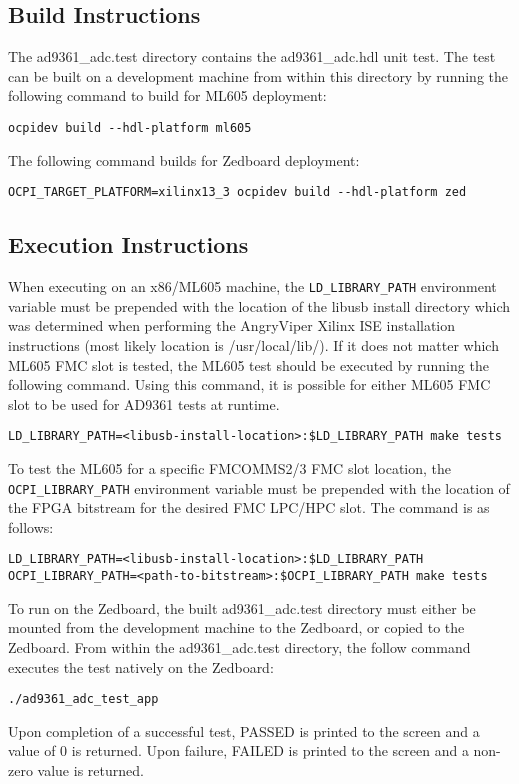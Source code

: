 \documentclass{article}
\def\comp{ad9361\_adc}
\begin{document}
\subsection*{Build Instructions}
The \comp{}.test directory contains the \comp{}.hdl unit test. The test can be built on a development machine from within this directory by running the following command to build for ML605 deployment:
\lstset{language=bash, columns=flexible, breaklines=true, prebreak=\textbackslash, basicstyle=\ttfamily, showstringspaces=false,upquote=true, aboveskip=\baselineskip, belowskip=\baselineskip}
\begin{lstlisting}
ocpidev build --hdl-platform ml605
\end{lstlisting}
The following command builds for Zedboard deployment:
\begin{lstlisting}
OCPI_TARGET_PLATFORM=xilinx13_3 ocpidev build --hdl-platform zed
\end{lstlisting}
\subsection*{Execution Instructions}
When executing on an x86/ML605 machine, the \texttt{LD\_LIBRARY\_PATH} environment variable must be prepended with the location of the libusb install directory which was determined when performing the AngryViper Xilinx ISE installation instructions\cite{vendor_tools_install} (most likely location is /usr/local/lib/). If it does not matter which ML605 FMC slot is tested, the ML605 test should be executed by running the following command. Using this command, it is possible for either ML605 FMC slot to be used for AD9361 tests at runtime.
\begin{lstlisting}
LD_LIBRARY_PATH=<libusb-install-location>:$LD_LIBRARY_PATH make tests
\end{lstlisting}
To test the ML605 for a specific FMCOMMS2/3 FMC slot location, the \texttt{OCPI\_LIBRARY\_PATH} environment variable must be prepended with the location of the FPGA bitstream for the desired FMC LPC/HPC slot. The command is as follows:
\begin{lstlisting}
LD_LIBRARY_PATH=<libusb-install-location>:$LD_LIBRARY_PATH OCPI_LIBRARY_PATH=<path-to-bitstream>:$OCPI_LIBRARY_PATH make tests
\end{lstlisting}
To run on the Zedboard, the built \comp{}.test directory must either be mounted from the development machine to the Zedboard, or copied to the Zedboard. From within the \comp{}.test directory, the follow command executes the test natively on the Zedboard:
\begin{lstlisting}
./ad9361_adc_test_app
\end{lstlisting}
Upon completion of a successful test, PASSED is printed to the screen and a value of 0 is returned. Upon failure, FAILED is printed to the screen and a non-zero value is returned.
\end{document}

